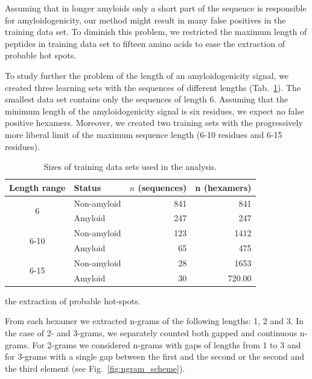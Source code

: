 \documentclass{bioinfo}
\begin{document}
\begin{methods}
  Assuming that in longer amyloids only a short part of the sequence is 
responsible for amyloidogenicity, our method might result in many false 
positives in the training data set. To diminish this problem, we restricted the 
maximum length of peptides in training data set to fifteen amino acids to ease 
the extraction of probable hot spots.

%
%
%

  To study further the problem of the length of an amyloidogenicity signal, we created three 
learning sets with the sequences of different lengths (Tab.~\ref{tab:training_sets}). 
The smallest data set contains only the sequences of length 6. Assuming that the minimum 
length of the amyloidogenicity signal is six residues, we expect no false positive 
hexamers. Moreover, we created two training sets with the progressively more liberal limit 
of the maximum sequence length (6-10 residues and 6-15 residues).

\begin{table}[]
\centering
\caption{Sizes of training data sets used in the analysis.}
\label{tab:training_sets}
\begin{tabular}{clrr}
\hline
Length range & Status & $n$ (sequences) & n (hexamers) \\ \hline
\multirow{2}{*}{6} & Non-amyloid & 841 & 841 \\
 & Amyloid & 247 & 247 \\
\hline
\multirow{2}{*}{6-10} & Non-amyloid & 123 & 1412 \\
 & Amyloid & 65 & 475 \\
\hline
\multirow{2}{*}{6-15} & Non-amyloid & 28 & 1653 \\
 & Amyloid & 30 & 720.00 \\
\hline
\end{tabular}
\end{table}

%
%
%
the extraction of probable hot-spots.

  From each hexamer we extracted n-grams of the following lengths: 1, 2 and 3. In 
the case of 2- and 3-grams, we separately counted both gapped and continuous 
n-grams. For 2-grams we considered n-grams with gaps of lengths from 1 to 3 and for 
%
%
%
3-grams with a single gap between the first and the second or the second and the 
third element (see Fig.~\ref{fig:ngram_scheme}).


\end{methods}
\end{document}
